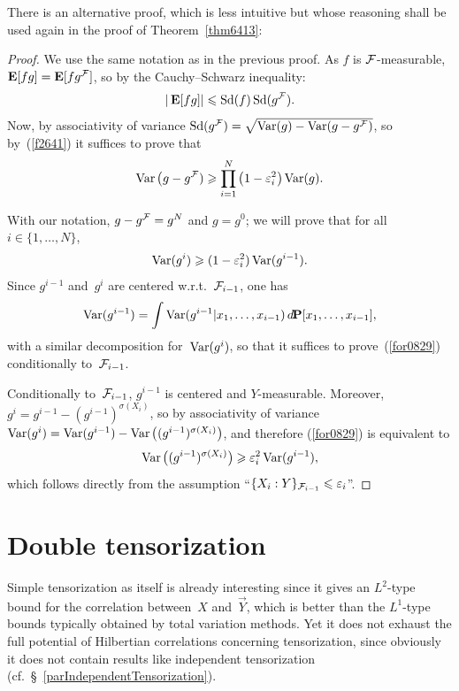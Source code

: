 There is an alternative proof, which is less intuitive
but whose reasoning shall be used again in the proof of Theorem~\ref{thm6413}:
%
\begingroup\def\proofname{Alternative proof of Theorem~\ref{thm5750}}
\begin{proof}
We use the same notation as in the previous proof.
As $f$ is $\mathcal{F}$-measurable, $\mathop{\smash{\mathbf{E}}}\nolimits[fg] = \mathop{\smash{\mathbf{E}}}\nolimits[fg^{\mathcal{F}}]$,
so by the Cauchy--Schwarz inequality:
\[\label{f2641} |\mathop{\smash{\mathbf{E}}}\nolimits[fg]| \leqslant \operatorname{Sd}(f) \operatorname{Sd}(g^{\mathcal{F}}) .\]
Now, by associativity of variance $\operatorname{Sd}(g^{\mathcal{F}}) = \sqrt{\operatorname{Var}(g)-\operatorname{Var}(g-g^{\mathcal{F}})}$,
so by~(\ref{f2641}) it suffices to prove that
\[\label{for5211}
\Var\big(g-g^{\mcal{F}}) \geq \prod_{i=1}^N \big(1-\epsilon_i^2\big) \Var(g) .\]

With our notation, $g-g^{\mathcal{F}} = g^N$ and $g = g^0$;
we will prove that for all~$i\in\{1,\ldots,N\}$,
\[\label{for0829} \operatorname{Var}(g^i) \geqslant (1-\varepsilon_i^2) \operatorname{Var}(g^{i-1}) .\]
%
Since $g^{i-1}$ and~$g^i$ are centered w.r.t.~$\mathcal{F}_{i-1}$,
one has
\[ \Var(g^{i-1}) = \int \Var(g^{i-1}|x_1,\ldots,x_{i-1}) \,\dx\Pr[x_1,\ldots,x_{i-1}] ,\]
with a similar decomposition for~$\operatorname{Var}(g^i)$,
so that it suffices to prove~(\ref{for0829}) conditionally to~$\mathcal{F}_{i-1}$.

Conditionally to~$\mathcal{F}_{i-1}$, $g^{i-1}$ is centered and $Y$-measurable.
Moreover, $g^i = g^{i-1} - (g^{i-1})^{\sigma(X_i)}$,
so by associativity of variance
$\Var(g^i) = \Var(g^{i-1}) - \Var\big( (g^{i-1})^{\sigma(X_i)} \big)$,
and therefore (\ref{for0829}) is equivalent to
\[ \Var\big( (g^{i-1})^{\sigma(X_i)} \big) \geq \epsilon_i^2 \Var(g^{i-1}) ,\]
which follows directly from the assumption ``$\{X_i:Y\}_{\mathcal{F}_{i-1}} \leqslant \varepsilon_i$''.
\end{proof}\endgroup




\section{Double tensorization}\label{parDoubleTensorization}

Simple tensorization as itself is already interesting
since it gives an $L^2$-type bound for the correlation between~$X$ and~$\vec{Y}$,
which is better than the $L^1$-type bounds
typically obtained by total variation methods.
Yet it does not exhaust
the full potential of Hilbertian correlations
concerning tensorization, since obviously
it does not contain results like independent tensorization
(cf.\ \S~\ref{parIndependentTensorization}).

